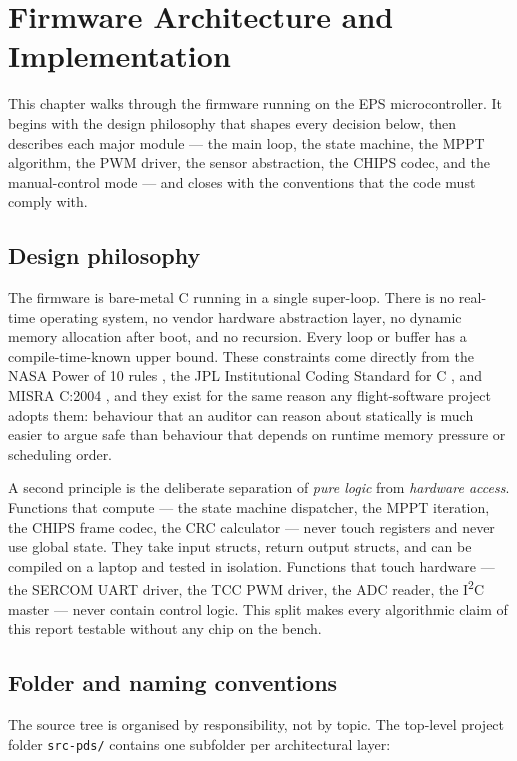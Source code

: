 \section{Firmware Architecture and Implementation}
\label{sec:architecture}

This chapter walks through the firmware running on the EPS
microcontroller. It begins with the design philosophy that shapes
every decision below, then describes each major module --- the main
loop, the state machine, the MPPT algorithm, the PWM driver, the
sensor abstraction, the CHIPS codec, and the manual-control
mode --- and closes with the conventions that the code must comply
with.

\subsection{Design philosophy}

The firmware is bare-metal C running in a single super-loop. There
is no real-time operating system, no vendor hardware abstraction
layer, no dynamic memory allocation after boot, and no recursion.
Every loop or buffer has a compile-time-known upper bound. These
constraints come directly from the NASA Power of 10 rules
\cite{holzmann_powerof10_2006}, the JPL Institutional Coding
Standard for C \cite{jpl_d60411_2009}, and MISRA C:2004
\cite{misra_c_2004}, and they exist for the same reason any
flight-software project adopts them: behaviour that an auditor can
reason about statically is much easier to argue safe than behaviour
that depends on runtime memory pressure or scheduling order.

A second principle is the deliberate separation of \textit{pure
logic} from \textit{hardware access}. Functions that compute --- the
state machine dispatcher, the MPPT iteration, the CHIPS frame
codec, the CRC calculator --- never touch registers and never use
global state. They take input structs, return output structs, and
can be compiled on a laptop and tested in isolation. Functions
that touch hardware --- the SERCOM UART driver, the TCC PWM
driver, the ADC reader, the I\textsuperscript{2}C master --- never
contain control logic. This split makes every algorithmic claim of
this report testable without any chip on the bench.

\subsection{Folder and naming conventions}

The source tree is organised by responsibility, not by topic. The
top-level project folder \texttt{src-pds/} contains one subfolder
per architectural layer:

